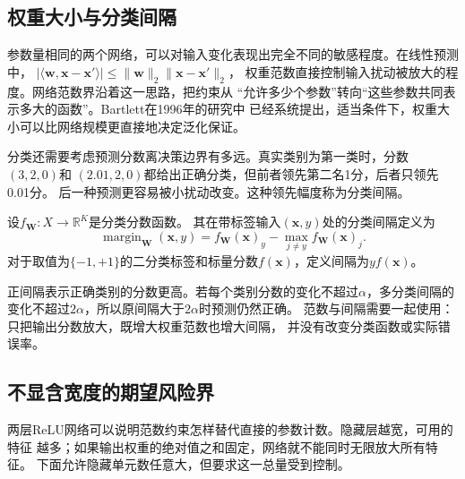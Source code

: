 \subsection{权重大小与分类间隔}

参数量相同的两个网络，可以对输入变化表现出完全不同的敏感程度。在线性预测中，
$|\langle\bm w,\bm x-\bm x'\rangle|\leq\|\bm w\|_2\|\bm x-\bm x'\|_2$，
权重范数直接控制输入扰动被放大的程度。网络范数界沿着这一思路，把约束从
“允许多少个参数”转向“这些参数共同表示多大的函数”。Bartlett在1996年的研究中
已经系统提出，适当条件下，权重大小可以比网络规模更直接地决定泛化保证。

分类还需要考虑预测分数离决策边界有多远。真实类别为第一类时，分数$(3,2,0)$和
$(2.01,2,0)$都给出正确分类，但前者领先第二名1分，后者只领先0.01分。
后一种预测更容易被小扰动改变。这种领先幅度称为分类间隔。

\begin{definition}[分类间隔]
\label{def:network-margin}
设$f_{\bm W}:X\to\mathbb R^K$是分类分数函数。
其在带标签输入$(\bm x,y)$处的分类间隔定义为
\begin{equation}
 \operatorname{margin}_{\bm W}(\bm x,y)
 =f_{\bm W}(\bm x)_y-\max_{j\neq y}f_{\bm W}(\bm x)_j.
 \label{eq:network-margin}
\end{equation}
对于取值为$\{-1,+1\}$的二分类标签和标量分数$f(\bm x)$，定义间隔为$yf(\bm x)$。
\end{definition}

正间隔表示正确类别的分数更高。若每个类别分数的变化不超过$\alpha$，多分类间隔的
变化不超过$2\alpha$，所以原间隔大于$2\alpha$时预测仍然正确。
范数与间隔需要一起使用：只把输出分数放大，既增大权重范数也增大间隔，
并没有改变分类函数或实际错误率。

\subsection{不显含宽度的期望风险界}

两层ReLU网络可以说明范数约束怎样替代直接的参数计数。隐藏层越宽，可用的特征
越多；如果输出权重的绝对值之和固定，网络就不能同时无限放大所有特征。
下面允许隐藏单元数任意大，但要求这一总量受到控制。

